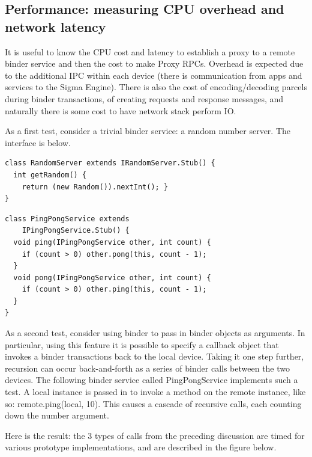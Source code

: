 \documentclass[prodmode]{acmlarge}
\begin{document}
\subsection{Performance: measuring CPU overhead and network latency}
It is useful to know the CPU cost and latency to establish a proxy to a remote binder service and then the cost to make Proxy RPCs. Overhead is expected due to the additional IPC within each device (there is communication from apps and services to the Sigma Engine). There is also the cost of encoding/decoding parcels during binder transactions, of creating requests and response messages, and naturally there is some cost to have network stack perform IO.

As a first test, consider a trivial binder service: a random number server. The interface is below.
\begin{Verbatim}[samepage=true]
class RandomServer extends IRandomServer.Stub() {
  int getRandom() { 
    return (new Random()).nextInt(); }
}
\end{Verbatim}


\begin{Verbatim}[samepage=true]
class PingPongService extends
    IPingPongService.Stub() {
  void ping(IPingPongService other, int count) {
    if (count > 0) other.pong(this, count - 1);
  }
  void pong(IPingPongService other, int count) {
    if (count > 0) other.ping(this, count - 1);
  }
}
\end{Verbatim}

As a second test, consider using binder to pass in binder objects as arguments. In particular, using this feature it is possible to specify a callback object that invokes a binder transactions back to the local device. Taking it one step further, recursion can occur back-and-forth as a series of binder calls between the two devices. The following binder service called PingPongService implements such a test. A local instance is passed in to invoke a method on the remote instance, like so: remote.ping(local, 10). This causes a cascade of recursive calls, each counting down the number argument.

Here is the result: the 3 types of calls from the preceding discussion are timed for various prototype implementations, and are described in the figure below.
\end{document}
